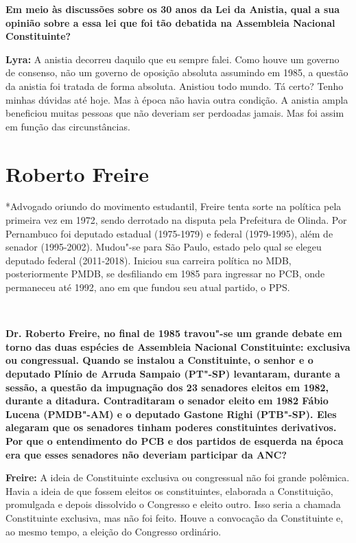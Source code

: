 \textbf{Em meio às discussões sobre os 30 anos da Lei da Anistia, qual a
sua opinião sobre a essa lei que foi tão debatida na Assembleia Nacional
Constituinte?}

\textbf{Lyra:} A anistia decorreu daquilo que eu sempre falei. Como
houve um governo de consenso, não um governo de oposição absoluta
assumindo em 1985, a questão da anistia foi tratada de forma absoluta.
Anistiou todo mundo. Tá certo? Tenho minhas dúvidas até hoje. Mas à
época não havia outra condição. A anistia ampla beneficiou muitas
pessoas que não deveriam ser perdoadas jamais. Mas foi assim em função
das circunstâncias.

\section{Roberto Freire}

*Advogado oriundo do movimento estudantil, Freire tenta sorte na
política pela primeira vez em 1972, sendo derrotado na disputa pela
Prefeitura de Olinda. Por Pernambuco foi deputado estadual (1975-1979) e
federal (1979-1995), além de senador (1995-2002). Mudou"-se para São
Paulo, estado pelo qual se elegeu deputado federal (2011-2018). Iniciou
sua carreira política no MDB, posteriormente PMDB, se desfiliando em
1985 para ingressar no PCB, onde permaneceu até 1992, ano em que fundou
seu atual partido, o PPS.

​

\textbf{Dr. Roberto Freire, no final de 1985 travou"-se um grande debate
em torno das duas espécies de Assembleia Nacional Constituinte:
exclusiva ou congressual. Quando se instalou a Constituinte, o senhor e
o deputado Plínio de Arruda Sampaio (PT"-SP) levantaram, durante a
sessão, a questão da impugnação dos 23 senadores eleitos em 1982,
durante a ditadura. Contraditaram o senador eleito em 1982 Fábio Lucena
(PMDB"-AM) e o deputado Gastone Righi (PTB"-SP). Eles alegaram que os
senadores tinham poderes constituintes derivativos. Por que o
entendimento do PCB e dos partidos de esquerda na época era que esses
senadores não deveriam participar da ANC?}

\textbf{Freire:} A ideia de Constituinte exclusiva ou congressual não
foi grande polêmica. Havia a ideia de que fossem eleitos os
constituintes, elaborada a Constituição, promulgada e depois dissolvido
o Congresso e eleito outro. Isso seria a chamada Constituinte exclusiva,
mas não foi feito. Houve a convocação da Constituinte e, ao mesmo tempo,
a eleição do Congresso ordinário.

